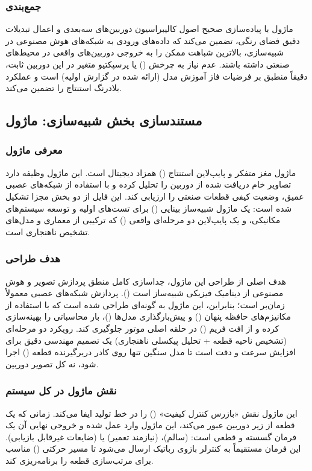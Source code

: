 \documentclass{article}
\begin{document}
\subsubsection{جمع‌بندی}
ماژول  با پیاده‌سازی صحیح اصول کالیبراسیون دوربین‌های سه‌بعدی و اعمال تبدیلات دقیق فضای رنگی، تضمین می‌کند که داده‌های ورودی به شبکه‌های هوش مصنوعی در شبیه‌سازی، بالاترین شباهت ممکن را به خروجی دوربین‌های واقعی در محیط‌های صنعتی داشته باشند. عدم نیاز به چرخش () یا پرسپکتیو متغیر در این دوربین ثابت، دقیقاً منطبق بر فرضیات فاز آموزش مدل (ارائه شده در گزارش اولیه) است و عملکرد بلادرنگ استنتاج را تضمین می‌کند.

\subsection{مستندسازی بخش شبیه‌سازی: ماژول }

\subsubsection{معرفی ماژول}
ماژول  مغز متفکر و پایپ‌لاین استنتاج () همزاد دیجیتال است. این ماژول وظیفه دارد تصاویر خام دریافت شده از دوربین را تحلیل کرده و با استفاده از شبکه‌های عصبی عمیق، وضعیت کیفی قطعات صنعتی را ارزیابی کند. این فایل از دو بخش مجزا تشکیل شده است: یک ماژول شبیه‌ساز بینایی () برای تست‌های اولیه و توسعه سیستم‌های مکانیکی، و یک پایپ‌لاین دو مرحله‌ای واقعی () که ترکیبی از معماری  و مدل‌های تشخیص ناهنجاری  است.

\subsubsection{هدف طراحی}
هدف اصلی از طراحی این ماژول، جداسازی کامل منطق پردازش تصویر و هوش مصنوعی از دینامیک فیزیکی شبیه‌ساز است (). پردازش شبکه‌های عصبی معمولاً زمان‌بر است؛ بنابراین، این ماژول به گونه‌ای طراحی شده است که با استفاده از مکانیزم‌های حافظه پنهان () و پیش‌بارگذاری مدل‌ها ()، بار محاسباتی را بهینه‌سازی کرده و از افت فریم () در حلقه اصلی موتور  جلوگیری کند. رویکرد دو مرحله‌ای (تشخیص ناحیه قطعه + تحلیل پیکسلی ناهنجاری) یک تصمیم مهندسی دقیق برای افزایش سرعت و دقت است تا مدل سنگین  تنها روی کادر دربرگیرنده قطعه () اجرا شود، نه کل تصویر دوربین.

\subsubsection{نقش ماژول در کل سیستم}
این ماژول نقش «بازرس کنترل کیفیت» () را در خط تولید ایفا می‌کند. زمانی که یک قطعه از زیر دوربین عبور می‌کند، این ماژول وارد عمل شده و خروجی نهایی آن یک فرمان گسسته و قطعی است:  (سالم)،  (نیازمند تعمیر) یا  (ضایعات غیرقابل بازیابی). این فرمان مستقیماً به کنترلر بازوی رباتیک ارسال می‌شود تا مسیر حرکتی () مناسب برای مرتب‌سازی قطعه را برنامه‌ریزی کند.
\end{document}
